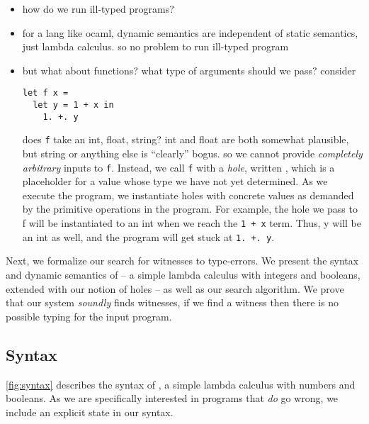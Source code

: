 
\begin{itemize}
\item how do we run ill-typed programs?
\item for a lang like ocaml, dynamic semantics are independent of static
  semantics, just lambda calculus. so no problem to run ill-typed
  program
\item but what about functions? what type of arguments should we pass? consider

\begin{lstlisting}
let f x = 
  let y = 1 + x in
    1. +. y
\end{lstlisting}

does \texttt{f} take an int, float, string? int and float are both
somewhat plausible, but string or anything else is ``clearly'' bogus. so
we cannot provide \emph{completely arbitrary} inputs to
\texttt{f}. Instead, we call \texttt{f} with a \emph{hole}, written
\ehole{}, which is a placeholder for a value whose type we have not
yet determined. As we execute the program, we instantiate holes with
concrete values as demanded by the primitive operations in the
program. For example, the hole we pass to f will be instantiated to an
int when we reach the \lstinline{1 + x} term. Thus, y will be an int as
well, and the program will get stuck at \lstinline{1. +. y}. 

\end{itemize}

Next, we formalize our search for witnesses to type-errors. We present
the syntax and dynamic semantics of \lang -- a simple lambda calculus with
integers and booleans, extended with our notion of holes -- as well as our
search algorithm. We prove that our system \emph{soundly} finds
witnesses, \ie if we find a witness then there is no possible typing for
the input program.

\subsection{Syntax}
\label{sec:syntax}


\autoref{fig:syntax} describes the syntax of \lang, a simple lambda
calculus with numbers and booleans. As we are specifically interested in
programs that \emph{do} go wrong, we include an explicit \stuck state in
our syntax.


